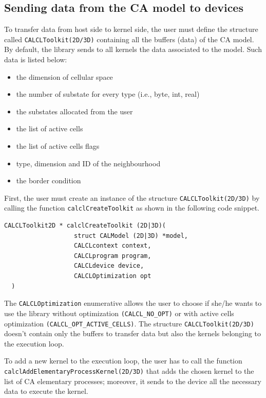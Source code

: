 \subsection{Sending data from the CA model to devices}

To transfer data from host side to kernel side, the user must define
the structure called \verb'CALCLToolkit(2D/3D)' containing all the
buffers (data) of the CA model. By default, the library sends to all
kernels the data associated to the model. Such data is listed
below:

\begin{itemize}
	\item the dimension of cellular space
	\item the number of substate for every type (i.e., byte, int, real)
	\item the substates allocated from the user
	\item the list of active cells
	\item the list of active cells flags
	\item type, dimension and ID of the neighbourhood
	\item the border condition
\end{itemize}

First, the user must create an instance of the structure
\verb'CALCLToolkit(2D/3D)' by calling the function
\verb'calclCreateToolkit' as shown in the following code snippet.

\begin{lstlisting}[numbers=none]
  CALCLToolkit2D * calclCreateToolkit (2D|3D)(
                   struct CALModel (2D|3D) *model,
                   CALCLcontext context,
                   CALCLprogram program,
                   CALCLdevice device,
                   CALCLOptimization opt
  )
\end{lstlisting}

The \verb'CALCLOptimization' enumerative allows the user to choose if
she/he wants to use the library without optimization
\verb|(CALCL_NO_OPT)| or with active cells optimization
\verb|(CALCL_OPT_ACTIVE_CELLS)|. The structure
\verb'CALCLToolkit(2D/3D)' doesn't contain only the buffers to
transfer data but also the kernels belonging to the execution
loop.

To add a new kernel to the execution loop, the user has to
call the function \verb'calclAddElementaryProcessKernel(2D/3D)' that
adds the chosen kernel to the list of CA elementary processes;
moreover, it sends to the device all the necessary data to execute the
kernel.


